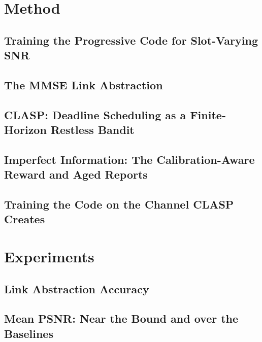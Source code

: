 \documentclass[lettersize,journal]{IEEEtran}
\begin{document}






\section{Method}
\label{sec:method}

\subsection{Training the Progressive Code for Slot-Varying SNR}
\label{sec:method-training}

\subsection{The MMSE Link Abstraction}
\label{sec:method-abstraction}

\subsection{CLASP: Deadline Scheduling as a Finite-Horizon Restless Bandit}
\label{sec:method-clasp}

\subsection{Imperfect Information: The Calibration-Aware Reward and Aged Reports}
\label{sec:method-csi}

\subsection{Training the Code on the Channel CLASP Creates}
\label{sec:method-codesign}

\section{Experiments}
\label{sec:eval}

\subsection{Link Abstraction Accuracy}
\label{sec:eval-abstraction}

\subsection{Mean PSNR: Near the Bound and over the Baselines}
\label{sec:eval-mean}
\end{document}
